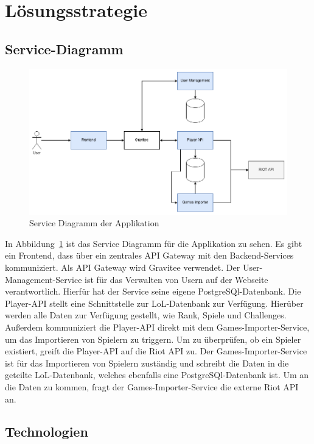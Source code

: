\section{Lösungsstrategie}

\subsection{Service-Diagramm}

\begin{figure}
    \centering
    \includegraphics[width=\textwidth]{images/cdc-05-service-diagram.drawio}
    \caption{Service Diagramm der Applikation}
    \label{fig:service-diagram}
\end{figure}

In Abbildung~\ref{fig:service-diagram} ist das Service Diagramm für die Applikation zu sehen.
Es gibt ein Frontend, dass über ein zentrales API Gateway mit den Backend-Services kommuniziert.
Als API Gateway wird Gravitee verwendet.
Der User-Management-Service ist für das Verwalten von Usern auf der Webseite verantwortlich.
Hierfür hat der Service seine eigene PostgreSQl-Datenbank.
Die Player-API stellt eine Schnittstelle zur LoL-Datenbank zur Verfügung.
Hierüber werden alle Daten zur Verfügung gestellt, wie Rank, Spiele und Challenges.
Außerdem kommuniziert die Player-API direkt mit dem Games-Importer-Service, um das Importieren von Spielern zu triggern.
Um zu überprüfen, ob ein Spieler existiert, greift die Player-API auf die Riot API zu.
Der Games-Importer-Service ist für das Importieren von Spielern zuständig und schreibt die Daten in die geteilte
LoL-Datenbank, welches ebenfalls eine PostgreSQl-Datenbank ist.
Um an die Daten zu kommen, fragt der Games-Importer-Service die externe Riot API an. 

\subsection{Technologien}

